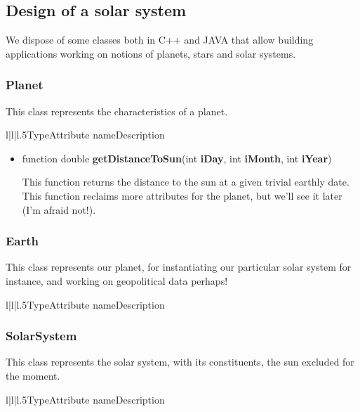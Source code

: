 \subsection{Design of a solar system}
We dispose of some classes both in C++ and JAVA that allow building applications working on
notions of planets, stars and solar systems.

		\subsubsection{Planet}

This class represents the characteristics of a planet.

		\begin{tableiii}{l|l|l}{.5}{Type}{Attribute name}{Description}
\end{tableiii}


		\begin{itemize}
\item function double \textbf{getDistanceToSun}(int \textbf{iDay}, int \textbf{iMonth}, int \textbf{iYear})
				


This function returns the distance to the sun at a given trivial earthly date. This function
reclaims more attributes for the planet, but we'll see it later (I'm afraid not!).

			
\end{itemize}


		\subsubsection{Earth}

This class represents our planet, for instantiating our particular solar system for instance,
and working on geopolitical data perhaps!

		\begin{tableiii}{l|l|l}{.5}{Type}{Attribute name}{Description}
\end{tableiii}


		\subsubsection{SolarSystem}

This class represents the solar system, with its constituents, the sun excluded for the
moment.

		\begin{tableiii}{l|l|l}{.5}{Type}{Attribute name}{Description}
\end{tableiii}


	